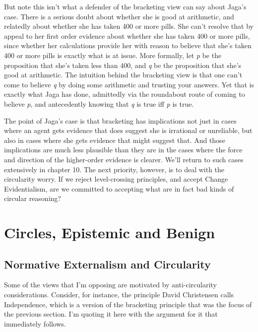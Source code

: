 \documentclass[
  10pt,
  letterpaper,
  twoside]{scrbook}
\begin{document}
But note this isn't what a defender of the bracketing view can say about
{Jaga}'s case. There is a serious doubt about whether she is good at
arithmetic, and relatedly about whether she has taken 400 or more pills.
She can't resolve that by appeal to her first order evidence about
whether she has taken 400 or more pills, since whether her calculations
provide her with reason to believe that she's taken 400 or more pills is
exactly what is at issue. More formally, let \emph{p} be the proposition
that she's taken less than 400, and \emph{q} be the proposition that
she's good at arithmetic. The intuition behind the bracketing view is
that one can't come to believe \emph{q} by doing some arithmetic and
trusting your answers. Yet that is exactly what {Jaga} has done,
admittedly via the roundabout route of coming to believe \emph{p}, and
antecedently knowing that \emph{q} is true iff \emph{p} is true.

The point of {Jaga}'s case is that bracketing has implications not just
in cases where an agent gets evidence that does suggest she is
irrational or unreliable, but also in cases where she gets evidence that
might suggest that. And those implications are much less plausible than
they are in the cases where the force and direction of the higher-order
evidence is clearer. We'll return to such cases extensively in chapter
10. The next priority, however, is to deal with the circularity worry.
If we reject level-crossing principles, and accept Change Evidentialism,
are we committed to accepting what are in fact bad kinds of circular
reasoning?

\chapter{Circles, Epistemic and Benign}\label{circlesepistemicandbenign}

\section{Normative Externalism and
Circularity}\label{normativeexternalismandcircularity}

Some of the views that I'm opposing are motivated by anti-circularity
considerations. Consider, for instance, the principle David Christensen
calls Independence, which is a version of the bracketing principle that
was the focus of the previous section. I'm quoting it here with the
argument for it that immediately follows.
\end{document}
